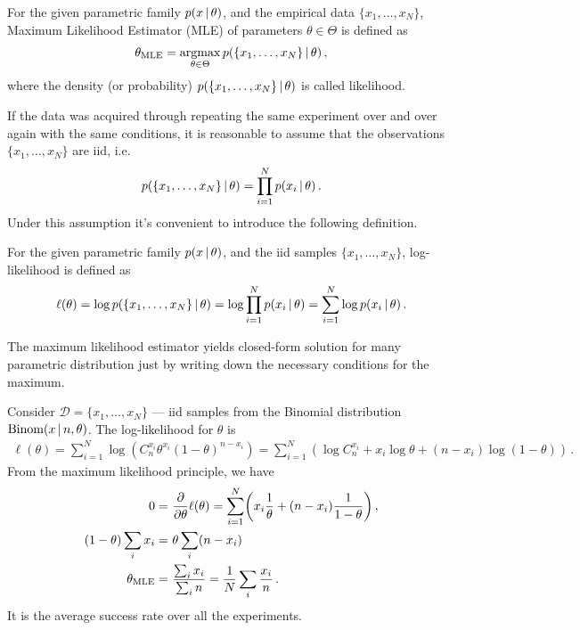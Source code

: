 \begin{mybox}
\begin{definition}
\label{def:mle}
    For the given parametric family $p(x\,|\, \theta)$, and the empirical data $\{x_1,\ldots, x_N\}$, Maximum Likelihood Estimator (MLE) of parameters $\theta \in \Theta$ is defined as
    \begin{align}
        \theta_{\text{MLE}} = \operatorname*{argmax}_{\theta \in \Theta} p(\{x_1,\ldots, x_N\}\,|\, \theta)\,,
    \end{align}
    where the density (or probability) $p(\{x_1,\ldots, x_N\}\,|\, \theta)$ is called likelihood.
\end{definition}
\end{mybox}
If the data was acquired through repeating the same experiment over and over again with the same conditions, it is reasonable to assume  that the observations $\{x_1,\ldots, x_N\}$ are iid, i.e.
\begin{align}
    p(\{x_1,\ldots, x_N\}\,|\, \theta) = \prod_{i=1}^N p(x_i\,|\, \theta)\,.
\end{align}
Under this assumption it's convenient to introduce the following definition.
\begin{mybox}
\begin{definition}\label{def:ll}
    For the given parametric family $p(x\,|\, \theta)$, and the iid samples $\{x_1,\ldots, x_N\}$, log-likelihood is defined as
    \begin{align}
        \ell(\theta) = \log p(\{x_1,\ldots, x_N\}\,|\, \theta) = \log \prod_{i=1}^N p(x_i\,|\, \theta) = \sum_{i=1}^N\log p(x_i\,|\, \theta)\,.
    \end{align}    
\end{definition}    
\end{mybox}

The maximum likelihood estimator yields closed-form solution for many parametric distribution just by writing down the necessary conditions for the maximum.
\begin{example}
    Consider $\mathcal{D}= \{x_1,\ldots,x_N\}$ --- iid samples from the Binomial distribution $\text{Binom}(x\,|\, n, \theta)$. 
    The log-likelihood for $\theta$ is
    \begin{align}
        \ell(\theta) = \sum_{i=1}^N \log \left(C_{n}^{x_i}\theta^{x_i}(1-\theta)^{n-x_i}\right) = \sum_{i=1}^N  \left(\log C_{n}^{x_i} + x_i\log \theta + (n-x_i)\log(1-\theta)\right)\,.
    \end{align}
    From the maximum likelihood principle, we have
    \begin{align}
        0 =~& \deriv{}{\theta}\ell(\theta) = \sum_{i=1}^N  \left(x_i\frac{1}{\theta} + (n-x_i)\frac{1}{1-\theta}\right)\,,\\
        (1-\theta)\sum_i x_i =~& \theta\sum_i(n-x_i)\\
        \theta_{\text{MLE}} =~& \frac{\sum_i x_i}{\sum_i n} = \frac{1}{N}\sum_i \frac{x_i}{n}\,.
    \end{align}
    It is the average success rate over all the experiments.
\end{example}

